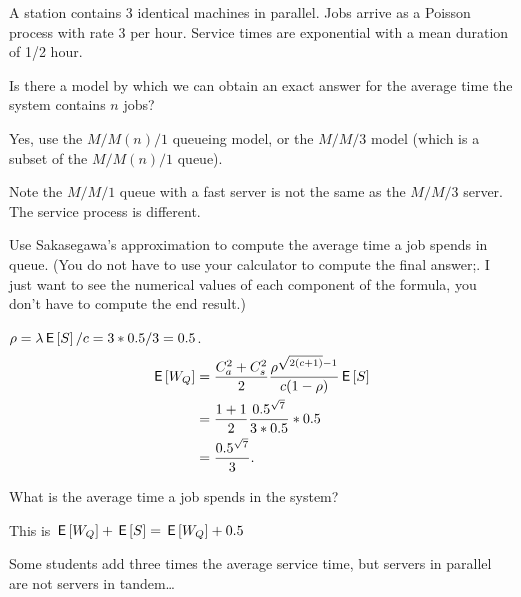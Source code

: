 A station contains 3 identical machines in parallel. Jobs arrive as a Poisson process with rate $3$ per hour. Service times are exponential with a mean duration of 1/2 hour. 

\begin{exercise}[201807]\label{ex:92}
  Is there a model by which we can obtain an exact answer for the average time the system contains $n$ jobs? 
\begin{solution}
    Yes, use the $M/M(n)/1$ queueing model, or the $M/M/3$ model (which is a subset of the $M/M(n)/1$ queue). 

Note the $M/M/1$ queue with a fast server is not the same as the $M/M/3$ server. The service process is different. 
\end{solution}
\end{exercise}


\begin{exercise}[201807]
Use Sakasegawa's approximation to compute the average time a job spends in queue. (You do not have to use your calculator to compute the final answer;. I just want to see the numerical values of each component of the formula, you don't have to compute the end result.)
\begin{solution}
$\rho = \lambda \,\mathsf{E}\left[S\right]/c = 3 *0.5/3=0.5$.
\begin{align*}
  \,\mathsf{E}\left[W_Q\right] 
&= \frac{C_a^2+C_s^2}2 \frac{\rho^{\sqrt{2(c+1)}-1}}{c(1-\rho)} \,\mathsf{E}\left[S\right] \\
&= \frac{1+1}2 \frac{0.5^{\sqrt{7}}}{3*0.5} *0.5 \\
&=\frac{0.5^{\sqrt{7}}}{3}. 
\end{align*}
\end{solution}
\end{exercise}


\begin{exercise}[201807]
  What is the average time a job spends in the system?
\begin{solution}
    This is $\,\mathsf{E}\left[W_Q\right] + \,\mathsf{E}\left[S\right] = \,\mathsf{E}\left[W_Q\right] + 0.5$
\end{solution}

Some students add three times the average service time, but servers in parallel are not servers in tandem\ldots
\end{exercise}


